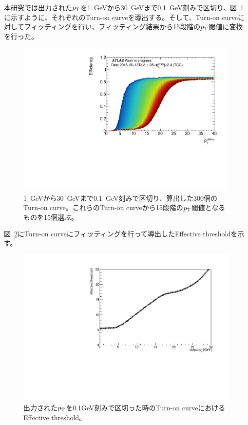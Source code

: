 本研究では出力された$p_{\rm{T}}$を1~GeVから30~GeVまで0.1~GeV刻みで区切り、図~\ref{fig:ALL_Turn-on}に示すように、それぞれのTurn-on curveを導出する。そして、Turn-on curveに対してフィッティングを行い、フィッティング結果から15段階の$p_{\rm{T}}$閾値に変換を行った。
\begin{figure}[htb]
  \centering
  \includegraphics[clip, width=11cm]{fig/4/ALLthr_v06_Data.pdf}
  \caption{1~GeVから30~GeVまで0.1~GeV刻みで区切り、算出した300個のTurn-on curve。これらのTurn-on curveから15段階の$p_{\rm{T}}$閾値となるものを15個選ぶ。}
  \label{fig:ALL_Turn-on}
\end{figure}
図~\ref{fig:Effictive_thr_v1}にTurn-on curveにフィッティングを行って導出したEffective thresholdを示す。
\begin{figure}[tb]
  \centering
  \includegraphics[clip, width=12cm]{fig/4/Effictive_thr_v1.pdf}
  \caption{出力された$p_{\rm{T}}$を0.1GeV刻みで区切った時のTurn-on curveにおけるEffective threshold。}
  \label{fig:Effictive_thr_v1}
\end{figure}

